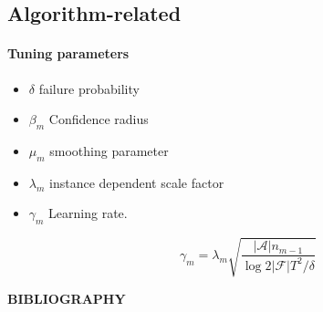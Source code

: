 \documentclass[12pt,,letterpaper,twoside]{report}
\newcommand{\mcA}{{\mathcal{A}}}
\newcommand{\mcF}{{\mathcal{F}}}
\begin{document}
\hypertarget{algorithm-related}{%
\subsection{Algorithm-related}\label{algorithm-related}}

\hypertarget{tuning-parameters}{%
\paragraph{Tuning parameters}\label{tuning-parameters}}

\begin{itemize}
\item $\delta$ failure probability
\item $\beta_m$ Confidence radius
\item $\mu_m$ smoothing parameter
\item $\lambda_m$ instance dependent scale factor
\item $\gamma_m$ Learning rate. 

$$\gamma_m = \lambda_m \sqrt{\frac{| \mcA| n_{m-1}}{\log{2 | \mcF | T^2 / \delta}}}$$
\end{itemize}



\clearpage
{}

{\def\chapter*#1{} %
\begin{singlespace}
\begin{center}
\normalsize \textbf{BIBLIOGRAPHY}
\vspace{17pt}
\end{center}



\end{singlespace}
}
\end{document}
